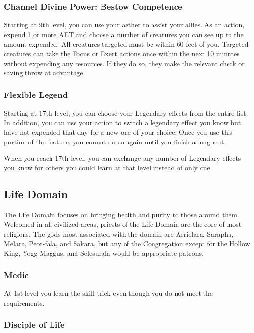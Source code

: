\subsubsection{Channel Divine Power: Bestow Competence}
Starting at 9th level, you can use your aether to assist your allies. As an action, expend 1 or more AET and choose a number of creatures you can see up to the amount expended. All creatures targeted must be within 60 feet of you. Targeted creatures can take the Focus or Exert actions once within the next 10 minutes without expending any resources. If they do so, they make the relevant check or saving throw at advantage.

\subsubsection{Flexible Legend}
Starting at 17th level, you can choose your Legendary effects from the entire list. In addition, you can use your action to switch a legendary effect you know but have not expended that day for a new one of your choice. Once you use this portion of the feature, you cannot do so again until you finish a long rest.

When you reach 17th level, you can exchange any number of Legendary effects you know for others you could learn at that level instead of only one.

\subsection{Life Domain}

The Life Domain focuses on bringing health and purity to those around them. Welcomed in all civilized areas, priests of the Life Domain are the core of most religions. The gods most associated with the domain are Aerielara, Sarapha, Melara, Peor-fala, and Sakara, but any of the Congregation except for the Hollow King, Yogg-Maggus, and Selesurala would be appropriate patrons.

\subsubsection{Medic}
At 1st level you learn the  skill trick even though you do not meet the requirements.

\subsubsection{Disciple of Life}

